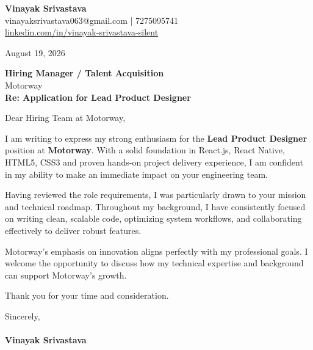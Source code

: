 \documentclass[11pt,a4paper]{article}
\begin{document}
\thispagestyle{empty}

{\Large \textbf{Vinayak Srivastava}}\\
vinayaksrivastava063@gmail.com | 7275095741 \\
\url{linkedin.com/in/vinayak-srivastava-silent}

\vspace{1em}
\hfill August 19, 2026

\textbf{Hiring Manager / Talent Acquisition}\\
Motorway\\

\vspace{1.5em}
\textbf{Re: Application for Lead Product Designer}

\vspace{1em}
Dear Hiring Team at Motorway,

I am writing to express my strong enthusiasm for the \textbf{Lead Product Designer} position at \textbf{Motorway}. With a solid foundation in React.js, React Native, HTML5, CSS3 and proven hands-on project delivery experience, I am confident in my ability to make an immediate impact on your engineering team.

Having reviewed the role requirements, I was particularly drawn to your mission and technical roadmap. Throughout my background, I have consistently focused on writing clean, scalable code, optimizing system workflows, and collaborating effectively to deliver robust features.

Motorway's emphasis on innovation aligns perfectly with my professional goals. I welcome the opportunity to discuss how my technical expertise and background can support Motorway's growth.

Thank you for your time and consideration.

\vspace{1.5em}
Sincerely,\\
\vspace{1em}\\
\textbf{Vinayak Srivastava}
\end{document}
